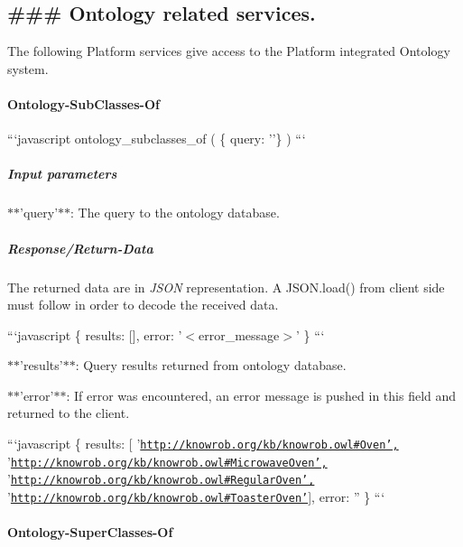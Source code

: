 \subsection*{\#\#\# Ontology related services. }

The following Platform services give access to the Platform integrated Ontology system.

\paragraph*{Ontology-\/\-Sub\-Classes-\/\-Of}

```javascript ontology\-\_\-subclasses\-\_\-of ( \{ query\-: ''\} ) ```

\subparagraph*{Input parameters}


\begin{DoxyItemize}
\item $\ast$$\ast$'query'$\ast$$\ast$\-: The query to the ontology database.
\end{DoxyItemize}

\subparagraph*{Response/\-Return-\/\-Data}

The returned data are in {\itshape J\-S\-O\-N} representation. A J\-S\-O\-N.\-load() from client side must follow in order to decode the received data.

```javascript \{ results\-: \mbox{[}\mbox{]}, error\-: '$<$error\-\_\-message$>$' \} ```


\begin{DoxyItemize}
\item $\ast$$\ast$'results'$\ast$$\ast$\-: Query results returned from ontology database.
\item $\ast$$\ast$'error'$\ast$$\ast$\-: If error was encountered, an error message is pushed in this field and returned to the client.
\end{DoxyItemize}

```javascript \{ results\-: \mbox{[} '\href{http://knowrob.org/kb/knowrob.owl#Oven',}{\tt http\-://knowrob.\-org/kb/knowrob.\-owl\#\-Oven',} '\href{http://knowrob.org/kb/knowrob.owl#MicrowaveOven',}{\tt http\-://knowrob.\-org/kb/knowrob.\-owl\#\-Microwave\-Oven',} '\href{http://knowrob.org/kb/knowrob.owl#RegularOven',}{\tt http\-://knowrob.\-org/kb/knowrob.\-owl\#\-Regular\-Oven',} '\href{http://knowrob.org/kb/knowrob.owl#ToasterOven'}{\tt http\-://knowrob.\-org/kb/knowrob.\-owl\#\-Toaster\-Oven'}\mbox{]}, error\-: '' \} ```

\paragraph*{Ontology-\/\-Super\-Classes-\/\-Of}

